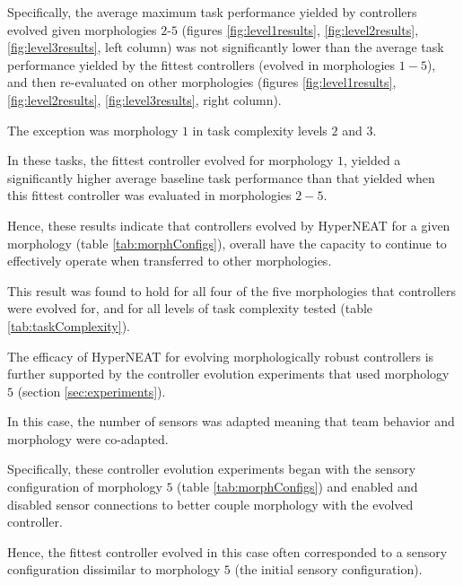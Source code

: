 Specifically, the average maximum task performance yielded by controllers evolved given morphologies $2$-$5$
(figures \ref{fig:level1results}, \ref{fig:level2results}, \ref{fig:level3results}, left column) was not
significantly lower than the average task performance yielded by the fittest controllers
(evolved in morphologies $1-5$), and then re-evaluated on other morphologies
(figures \ref{fig:level1results}, \ref{fig:level2results}, \ref{fig:level3results},
right column).  

The exception was morphology $1$ in task complexity levels $2$ and $3$.

In these tasks, the fittest controller evolved for morphology $1$, yielded a significantly higher average
baseline task performance than that yielded when this fittest controller was evaluated in
morphologies $2-5$.


Hence, these results indicate that controllers evolved by HyperNEAT for a given morphology
(table \ref{tab:morphConfigs}), overall have the capacity to continue to effectively operate
when transferred to other morphologies.

This result was found to hold for all four of the five morphologies that controllers were evolved for,
and for all levels of task complexity tested (table \ref{tab:taskComplexity}).

The efficacy of HyperNEAT for evolving morphologically robust controllers is further supported
by the controller evolution experiments that used morphology $5$ (section \ref{sec:experiments}).

In this case, the number of sensors was adapted meaning that team behavior and
morphology were co-adapted.

Specifically, these controller evolution experiments began with the sensory configuration of
morphology $5$ (table \ref{tab:morphConfigs}) and enabled and disabled sensor connections to
better couple morphology with the evolved controller.  

Hence, the fittest controller evolved in this case often corresponded to a sensory configuration
dissimilar to morphology $5$ (the initial sensory configuration).

